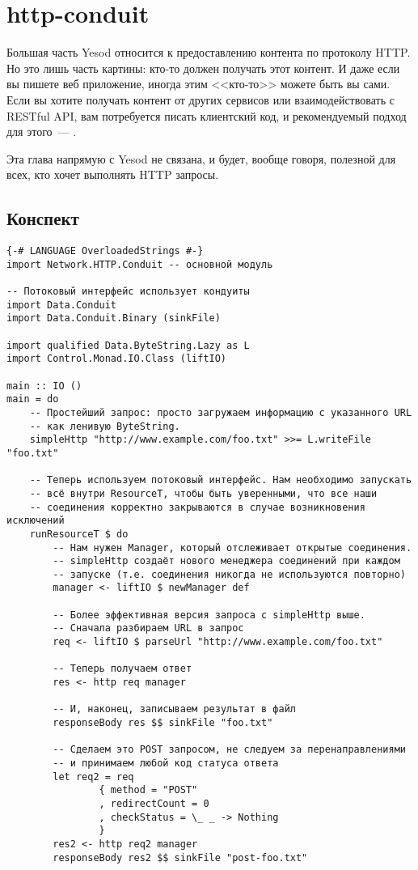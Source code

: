 \chapter{http-conduit}
Большая часть Yesod относится к предоставлению контента по протоколу
HTTP. Но это лишь часть картины: кто-то должен получать этот контент. И даже
если вы пишете веб приложение, иногда этим <<кто-то>> можете быть вы
сами. Если вы хотите получать контент от других сервисов или
взаимодействовать с RESTful API, вам потребуется писать
клиентский код, и рекомендуемый подход для этого~---
.

Эта глава напрямую с Yesod не связана, и будет, вообще говоря, полезной для
всех, кто хочет выполнять HTTP запросы.

\section{Конспект}
\begin{lstlisting}
{-# LANGUAGE OverloadedStrings #-}
import Network.HTTP.Conduit -- основной модуль

-- Потоковый интерфейс использует кондуиты
import Data.Conduit
import Data.Conduit.Binary (sinkFile)

import qualified Data.ByteString.Lazy as L
import Control.Monad.IO.Class (liftIO)

main :: IO ()
main = do
    -- Простейший запрос: просто загружаем информацию с указанного URL
    -- как ленивую ByteString.
    simpleHttp "http://www.example.com/foo.txt" >>= L.writeFile "foo.txt"

    -- Теперь используем потоковый интерфейс. Нам необходимо запускать
    -- всё внутри ResourceT, чтобы быть уверенными, что все наши
    -- соединения корректно закрываются в случае возникновения исключений
    runResourceT $ do
        -- Нам нужен Manager, который отслеживает открытые соединения.
        -- simpleHttp создаёт нового менеджера соединений при каждом
        -- запуске (т.е. соединения никогда не используются повторно)
        manager <- liftIO $ newManager def

        -- Более эффективная версия запроса с simpleHttp выше.
        -- Сначала разбираем URL в запрос
        req <- liftIO $ parseUrl "http://www.example.com/foo.txt"

        -- Теперь получаем ответ
        res <- http req manager

        -- И, наконец, записываем результат в файл
        responseBody res $$ sinkFile "foo.txt"

        -- Сделаем это POST запросом, не следуем за перенаправлениями
        -- и принимаем любой код статуса ответа
        let req2 = req
                { method = "POST"
                , redirectCount = 0
                , checkStatus = \_ _ -> Nothing
                }
        res2 <- http req2 manager
        responseBody res2 $$ sinkFile "post-foo.txt"
\end{lstlisting} %

